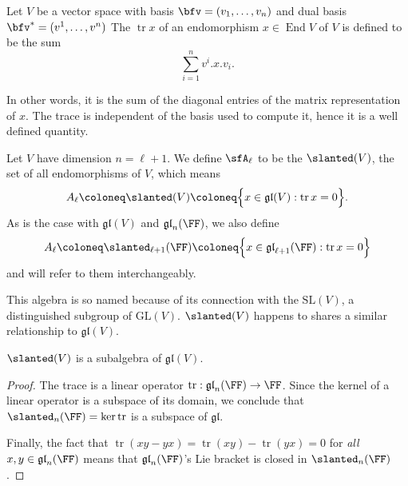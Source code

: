 \documentclass{article}
\DeclareMathOperator{\End}{End}
\DeclareMathOperator{\tr}{tr}
\newcommand*\GL{\ensuremath{\text{GL}}}
\newcommand*\SL{\ensuremath{\text{SL}}}
\newcommand*\gl{\ensuremath{\mathfrak{gl}}}
\let\sl\slanted
\newcommand*\sl{\ensuremath{\mathfrak{sl}}}
\newcommand*\acts{.}
\begin{document}
\begin{definition}
    Let $V$ be a vector space with basis $\bfv = (v_1, \ldots, v_n)$ and dual basis $\bfv^\ast = (v^1, \ldots, v^n)$
    The  $\tr x$ of an endomorphism $x \in \End V$ of $V$ is defined to be the sum
    \[
        \sum_{i=1}^n 
        v^i \acts x \acts v_i.
    \]
\end{definition}

In other words, it is the sum of the diagonal entries of the matrix representation of $x$.
The trace is independent of the basis used to compute it, hence it is a well defined quantity.

\begin{definition}
    Let $V$ have dimension $n = \ell + 1$.
    We define $\sfA_\ell$ to be the  $\sl(V)$, the set of all  endomorphisms of $V$, which means
    \[
        A_\ell
        \coloneq
        \sl(V)
        \coloneq
        \Big\{
            x \in \gl(V) : \tr x = 0
        \Big\}.
    \]
    As is the case with $\gl(V)$ and $\gl_n(\FF)$, we also define 
    \[
        A_\ell
        \coloneq
        \sl_{\ell+1}(\FF)
        \coloneq
        \Big\{
            x \in \gl_{\ell+1}(\FF) : \tr x = 0
        \Big\}
    \]
    and will refer to them interchangeably.
\end{definition}

This algebra is so named because of its connection with the  $\SL(V)$, a distinguished subgroup of $\GL(V)$.
$\sl(V)$ happens to shares a similar relationship to $\gl(V)$.

\begin{proposition}
    $\sl(V)$ is a subalgebra of $\gl(V)$.
\end{proposition}
\begin{proof}
    The trace is a linear operator $\tr: \gl_n(\FF) \to \FF$.
    Since the kernel of a linear operator is a subspace of its domain, we conclude that $\sl_n(\FF) = \ker \tr$ is a subspace of $\gl$.

    Finally, the fact that $\tr(xy - yx) = \tr(xy) - \tr(yx) = 0$ for \textit{all} $x,y \in \gl_n(\FF)$ means that $\gl_n(\FF)$'s Lie bracket is closed in $\sl_n(\FF)$.
\end{proof}
\end{document}
